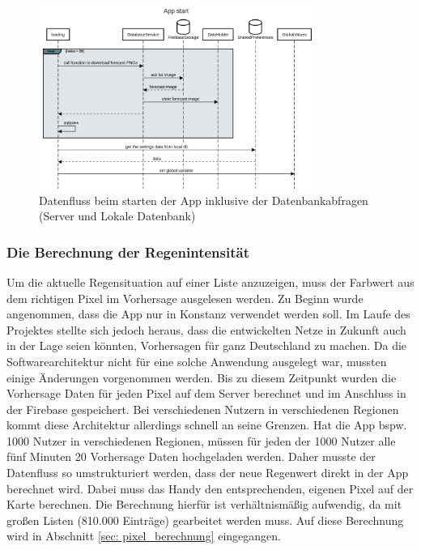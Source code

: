 \begin{figure}[H]
 \centering
 \includegraphics[width=0.8\textwidth,angle=0]{abb/sequence_diagram_app_start}
 \caption[Sequencediagram Appstart]{Datenfluss beim starten der App inklusive der Datenbankabfragen (Server und Lokale Datenbank)}
\label{fig:sequence_diagram_app_start}
\end{figure}

\subsubsection{Die Berechnung der Regenintensität}
Um die aktuelle Regensituation auf einer Liste anzuzeigen, muss der Farbwert aus dem richtigen Pixel im Vorhersage ausgelesen werden. 
Zu Beginn wurde angenommen, dass die App nur in Konstanz verwendet werden soll. 
Im Laufe des Projektes stellte sich jedoch heraus, dass die entwickelten Netze in Zukunft auch in der Lage seien könnten, Vorhersagen 
für ganz Deutschland zu machen. Da die Softwarearchitektur nicht für eine solche Anwendung ausgelegt war, 
mussten einige Änderungen vorgenommen werden. 
Bis zu diesem Zeitpunkt wurden die Vorhersage Daten für jeden Pixel auf dem Server berechnet und im Anschluss in 
der Firebase gespeichert. 
Bei verschiedenen Nutzern in verschiedenen Regionen kommt diese Architektur allerdings schnell an seine Grenzen. 
Hat die App bspw. 1000 Nutzer in verschiedenen Regionen, 
müssen für jeden der 1000 Nutzer alle fünf Minuten 20 Vorhersage Daten hochgeladen werden. 
Daher musste der Datenfluss so umstrukturiert werden, dass der neue Regenwert direkt in der App berechnet wird. 
Dabei muss das Handy den entsprechenden, eigenen Pixel auf der Karte berechnen. 
Die Berechnung hierfür ist verhältnismäßig aufwendig, da mit großen Listen (810.000 Einträge) gearbeitet werden muss.
Auf diese Berechnung wird in Abschnitt \ref{sec: pixel_berechnung} eingegangen. 

